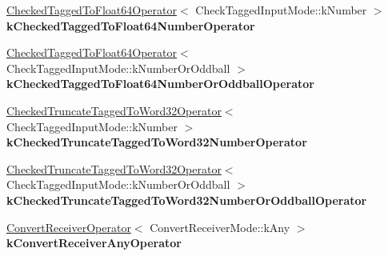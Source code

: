 \begin{DoxyCompactItemize}
\item 
\mbox{\label{structv8_1_1internal_1_1compiler_1_1SimplifiedOperatorGlobalCache_a0a01c9a63df3dcca39387a8ed3f43d7a}} 
\mbox{\hyperlink{structv8_1_1internal_1_1compiler_1_1SimplifiedOperatorGlobalCache_1_1CheckedTaggedToFloat64Operator}{Checked\+Tagged\+To\+Float64\+Operator}}$<$ Check\+Tagged\+Input\+Mode\+::k\+Number $>$ {\bfseries k\+Checked\+Tagged\+To\+Float64\+Number\+Operator}
\item 
\mbox{\label{structv8_1_1internal_1_1compiler_1_1SimplifiedOperatorGlobalCache_a182aa2a734111a62b65fa25c555845fd}} 
\mbox{\hyperlink{structv8_1_1internal_1_1compiler_1_1SimplifiedOperatorGlobalCache_1_1CheckedTaggedToFloat64Operator}{Checked\+Tagged\+To\+Float64\+Operator}}$<$ Check\+Tagged\+Input\+Mode\+::k\+Number\+Or\+Oddball $>$ {\bfseries k\+Checked\+Tagged\+To\+Float64\+Number\+Or\+Oddball\+Operator}
\item 
\mbox{\label{structv8_1_1internal_1_1compiler_1_1SimplifiedOperatorGlobalCache_a534d74f8bb6597a20dcf627feebd578c}} 
\mbox{\hyperlink{structv8_1_1internal_1_1compiler_1_1SimplifiedOperatorGlobalCache_1_1CheckedTruncateTaggedToWord32Operator}{Checked\+Truncate\+Tagged\+To\+Word32\+Operator}}$<$ Check\+Tagged\+Input\+Mode\+::k\+Number $>$ {\bfseries k\+Checked\+Truncate\+Tagged\+To\+Word32\+Number\+Operator}
\item 
\mbox{\label{structv8_1_1internal_1_1compiler_1_1SimplifiedOperatorGlobalCache_a5c99a8f36a311fce455ec7efad17a9da}} 
\mbox{\hyperlink{structv8_1_1internal_1_1compiler_1_1SimplifiedOperatorGlobalCache_1_1CheckedTruncateTaggedToWord32Operator}{Checked\+Truncate\+Tagged\+To\+Word32\+Operator}}$<$ Check\+Tagged\+Input\+Mode\+::k\+Number\+Or\+Oddball $>$ {\bfseries k\+Checked\+Truncate\+Tagged\+To\+Word32\+Number\+Or\+Oddball\+Operator}
\item 
\mbox{\label{structv8_1_1internal_1_1compiler_1_1SimplifiedOperatorGlobalCache_a49b6be4584251916dcd2c10c3d795c00}} 
\mbox{\hyperlink{structv8_1_1internal_1_1compiler_1_1SimplifiedOperatorGlobalCache_1_1ConvertReceiverOperator}{Convert\+Receiver\+Operator}}$<$ Convert\+Receiver\+Mode\+::k\+Any $>$ {\bfseries k\+Convert\+Receiver\+Any\+Operator}

\end{DoxyCompactItemize}
